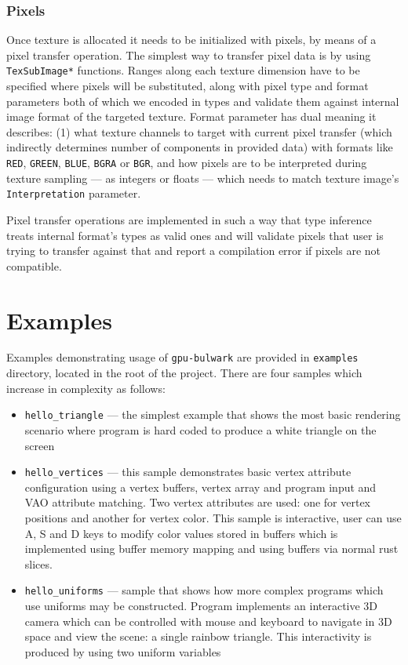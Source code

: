 \subsubsection{Pixels}

Once texture is allocated it needs to be initialized with pixels, by means of a pixel transfer operation.
The simplest way to transfer pixel data is by using \texttt{TexSubImage*} functions.
Ranges along each texture dimension have to be specified where pixels will be substituted,
along with pixel type and format parameters both of which we encoded in types and validate them 
against internal image format of the targeted texture.
Format parameter has dual meaning it describes: (1) what texture channels to target with current pixel transfer
(which indirectly determines number of components in provided data) with formats like \texttt{RED}, \texttt{GREEN}, \texttt{BLUE},
\texttt{BGRA} or \texttt{BGR}, and how pixels are to be interpreted during texture sampling --- as integers or floats --- which needs to match
texture image's \texttt{Interpretation} parameter.

Pixel transfer operations are implemented in such a way that type inference treats internal format's types
as valid ones and will validate pixels that user is trying to transfer against that and report a compilation error
if pixels are not compatible.

\section{Examples}

Examples demonstrating usage of \texttt{gpu-bulwark} are provided in \texttt{examples} directory, located in the root of the project.
There are four samples which increase in complexity as follows:
\begin{itemize}
    \item \texttt{hello\_triangle} --- the simplest example that shows the most basic rendering scenario where program is hard coded to produce a white
        triangle on the screen
    \item \texttt{hello\_vertices} --- this sample demonstrates basic vertex attribute configuration using a vertex buffers, 
        vertex array and program input and VAO attribute matching. 
        Two vertex attributes are used: one for vertex positions and another for vertex color.
        This sample is interactive, user can use A, S and D keys to modify color values stored in buffers 
        which is implemented using buffer memory mapping and using buffers via normal rust slices.
    \item \texttt{hello\_uniforms} --- sample that shows how more complex programs which use uniforms may be constructed.
        Program implements an interactive 3D camera which can be controlled with mouse and keyboard to navigate in 3D space and
        view the scene: a single rainbow triangle. This interactivity is produced by using two uniform variables 
\end{itemize}
